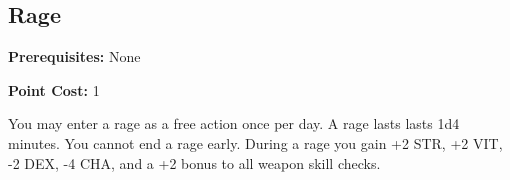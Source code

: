 \subsection*{Rage}\label{feat:rage}

\noindent
\textbf{Prerequisites:} None

\noindent
\textbf{Point Cost:} 1 

You may enter a rage as a free action once per day. A rage lasts lasts 1d4 minutes. You
cannot end a rage early. During a rage you gain +2 STR, +2 VIT, -2 DEX, -4 CHA,
and a +2 bonus to all weapon skill checks.
